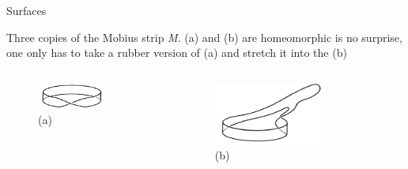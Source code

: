 \documentclass{beamer}
\begin{document}
\begin{frame}{Surfaces}
  \begin{block}{}
    Three copies of the Mobius strip \textsl{M}. (a) and (b) are homeomorphic is no surprise, one only has to take a rubber version of (a) and stretch it into the (b)
  \end{block}
  \begin{columns}
    \begin{column}{0.5\textwidth}
      \begin{figure}
        \centering
        \includegraphics[width=0.7\textwidth]{figure_1_14_a.png}
        \caption{(a)}
      \end{figure}
    \end{column}
    \begin{column}{0.5\textwidth}
      \begin{figure}
        \centering
        \includegraphics[width=0.7\textwidth]{figure_1_14_b.png}
        \caption{(b)}
      \end{figure}
    \end{column}
  \end{columns}
\end{frame}
\end{document}
